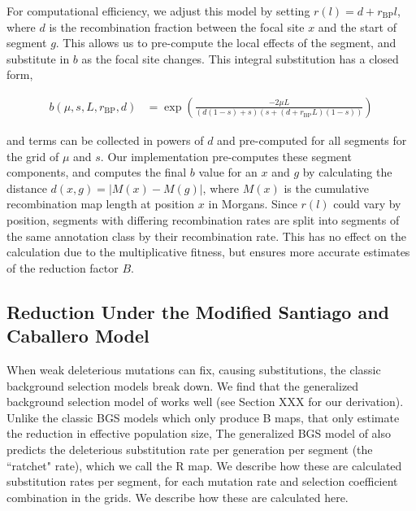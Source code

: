 \documentclass[11pt]{article}
\begin{document}
For computational efficiency, we adjust this model by setting $r(l) = d +
r_\text{BP} l$, where $d$ is the recombination fraction between the focal site
$x$ and the start of segment $g$. This allows us to pre-compute the local
effects of the segment, and substitute in $b$ as the focal site changes. This
integral substitution has a closed form,

\begin{align}
  b(\mu, s, L, r_\text{BP}, d) &= \exp \left( \frac{-2\mu L}{(d(1-s) + s)(s + (d + r_\text{BP}L)(1-s))} \right)
\end{align}

and terms can be collected in powers of $d$ and pre-computed for all segments
for the grid of $\mu$ and $s$. Our implementation pre-computes these segment
components, and computes the final $b$ value for an $x$ and $g$ by calculating
the distance $d(x,g) = |M(x) - M(g)|$, where $M(x)$ is the cumulative
recombination map length at position $x$ in Morgans. Since $r(l)$ could vary by
position, segments with differing recombination rates are split into segments
of the same annotation class by their recombination rate. This has no effect on
the calculation due to the multiplicative fitness, but ensures more accurate
estimates of the reduction factor $B$.


\subsection{Reduction Under the Modified Santiago and Caballero Model}

When weak deleterious mutations can fix, causing substitutions, the classic
background selection models break down. We find that the generalized background
selection model of \textcite{Santiago2016-mu} works well (see Section XXX for
our derivation). Unlike the classic BGS models which only produce B maps, that
only estimate the reduction in effective population size, The generalized BGS
model of \textcite{Santiago2016-mu} also predicts the deleterious substitution
rate per generation per segment (the ``ratchet" rate), which we call the R map.
We describe how these are calculated substitution rates per segment, for each
mutation rate and selection coefficient combination in the grids. We describe
how these are calculated here.
\end{document}
